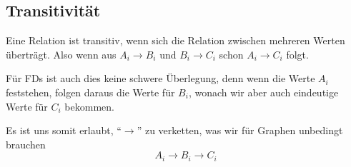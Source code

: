 \documentclass[a4paper, ngerman]{article}
\begin{document}
\subsection*{Transitivität}
Eine Relation ist transitiv,
wenn sich die Relation zwischen mehreren Werten überträgt.
Also wenn aus $A_i \to B_i$ und $B_i \to C_i$ schon $A_i \to C_i$ folgt.

Für FDs ist auch dies keine schwere Überlegung,
denn wenn die Werte $A_i$ feststehen,
folgen daraus die Werte für $B_i$,
wonach wir aber auch eindeutige Werte für $C_i$ bekommen.

Es ist uns somit erlaubt,
\enquote{$\to$} zu verketten,
was wir für Graphen unbedingt brauchen
$$
    A_i \to B_i \to C_i
$$
\end{document}
